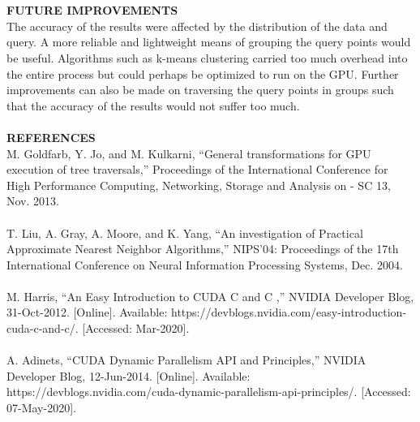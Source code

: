 \documentclass{article}
\begin{document}
~\\\\
\large
\textbf{FUTURE IMPROVEMENTS}\\
\normalsize
\newline
The accuracy of the results were affected by the distribution of the data and query. A more reliable and lightweight means of grouping the query points would be useful. Algorithms such as k-means clustering carried too much overhead into the entire process but could perhaps be optimized to run on the GPU. Further improvements can also be made on traversing the query points in groups such that the accuracy of the results would not suffer too much.\\
\\
\large
\textbf{REFERENCES}\\
\normalsize
\newline
[1] M. Goldfarb, Y. Jo, and M. Kulkarni, “General transformations for GPU execution of tree traversals,” Proceedings of the International Conference for High Performance Computing, Networking, Storage and Analysis on - SC 13, Nov. 2013.
\\\\
\noindent
[2] T. Liu, A. Gray, A. Moore, and K. Yang, “An investigation of Practical Approximate Nearest Neighbor Algorithms,” NIPS'04: Proceedings of the 17th International Conference on Neural Information Processing Systems, Dec. 2004.
\\\\
\noindent
[3] M. Harris, “An Easy Introduction to CUDA C and C ,” NVIDIA Developer Blog, 31-Oct-2012. [Online]. Available: https://devblogs.nvidia.com/easy-introduction-cuda-c-and-c/. [Accessed: Mar-2020].
\\\\
\noindent
[4] A. Adinets, “CUDA Dynamic Parallelism API and Principles,” NVIDIA Developer Blog, 12-Jun-2014. [Online]. Available: https://devblogs.nvidia.com/cuda-dynamic-parallelism-api-principles/. [Accessed: 07-May-2020].
\end{document}
